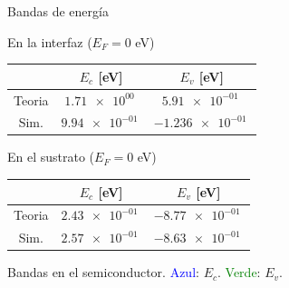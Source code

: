 \documentclass{/home/daniel/GitHub/USC-Physics-Degree-Notes/Notes/Presentacion}
\begin{document}
\begin{frame}{Bandas de energía}
    \begin{minipage}{0.4\linewidth}
        \begin{center}
            \small
            En la interfaz ($E_F=0$ eV)
            \vspace*{1em}
            \begin{tabular}{ccc}
                \toprule
                & $E_c $ [eV] & $E_v $ [eV]  \\ \midrule
                Teoria &  $\SI{1.71e+00}{}$& $\SI{5.91e-01}{}$\\
                Sim. &  $\SI{9.94e-01}{}$& $\SI{-1.236e-01}{}$  \\
                \bottomrule
            \end{tabular}

            \vspace*{2em}

            En el sustrato ($E_F=0$ eV) 

            \vspace*{1em}

            \begin{tabular}{ccc}
                \toprule
                & $E_c $ [eV] & $E_v $ [eV]  \\ \midrule
                Teoria & $\SI{2.43e-01}{}$ & $\SI{-8.77e-01}{}$ \\
                Sim. & $\SI{2.57e-01}{}$ & $\SI{-8.63e-01}{}$ \\
                \bottomrule
            \end{tabular}
        \end{center}
    \end{minipage}
    \hfill
    \begin{minipage}{0.55\linewidth}\centering

        Bandas en el semiconductor. \textcolor{blue}{Azul}: $E_c$. \textcolor{Green}{Verde}: $E_v$.  

        \vspace*{1em}
        

\end{minipage}
\end{frame}
\end{document}
